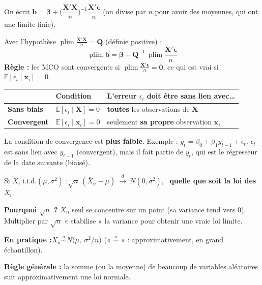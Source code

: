 \documentclass[12pt,a4paper]{article}
\newcommand{\vX}{\mathbf{X}}\newcommand{\vb}{\mathbf{b}}\newcommand{\vx}{\mathbf{x}}
\newcommand{\vbeta}{\bm{\beta}}\newcommand{\veps}{\bm{\epsilon}}\newcommand{\Q}{\mathbf{Q}}\newcommand{\I}{\mathbf{I}}
\newcommand{\E}{\mathbb{E}}\newcommand{\Var}{\operatorname{Var}}\newcommand{\plim}{\operatorname{plim}}
\begin{document}
\begin{outil}[title={Les MCO sont convergents}]
On écrit $\vb=\vbeta+\Big(\dfrac{\vX'\vX}{n}\Big)^{-1}\dfrac{\vX'\veps}{n}$ (on divise par $n$ pour avoir des moyennes, qui ont une limite finie).

Avec l'hypothèse $\plim\frac{\vX'\vX}{n}=\Q$ (définie positive) :
\[
\plim\vb=\vbeta+\Q^{-1}\,\plim\frac{\vX'\veps}{n}
\]
\textbf{Règle :} les MCO sont convergents si $\plim\frac{\vX'\veps}{n}=\mathbf 0$, ce qui est vrai si $\E[\epsilon_i\mid\vx_i]=0$.
\end{outil}

\begin{outil}[title={Sans biais ou convergent : la différence clé}]
\begin{center}
\renewcommand{\arraystretch}{1.3}
\begin{tabular}{@{}lll@{}}
\toprule
& Condition & L'erreur $\epsilon_i$ doit être sans lien avec\dots \\
\midrule
\textbf{Sans biais} & $\E[\epsilon_i\mid\vX]=0$ & \textbf{toutes} les observations de $\vX$ \\
\textbf{Convergent} & $\E[\epsilon_i\mid\vx_i]=0$ & seulement \textbf{sa propre} observation $\vx_i$ \\
\bottomrule
\end{tabular}
\end{center}
La condition de convergence est \textbf{plus faible}. Exemple : $y_t=\beta_0+\beta_1y_{t-1}+\epsilon_t$. $\epsilon_t$ est sans lien avec $y_{t-1}$ (convergent), mais il fait partie de $y_t$, qui est le régresseur de la date suivante (biaisé).
\end{outil}

\begin{outil}[title={Théorème central limite (TCL)}]
Si $X_i$ i.i.d.$(\mu,\sigma^2)$ :\quad $\sqrt n\,(\bar X_n-\mu)\ \xrightarrow{d}\ N(0,\sigma^2)$, \ \textbf{quelle que soit la loi des $X_i$}.

\textbf{Pourquoi $\sqrt n$ ?} $\bar X_n$ seul se concentre sur un point (sa variance tend vers 0). Multiplier par $\sqrt n$ « stabilise » la variance pour obtenir une vraie loi limite.

\textbf{En pratique :}\quad $\bar X_n\overset{a}{\sim}N\big(\mu,\ \sigma^2/n\big)$ (« $\overset{a}{\sim}$ » : approximativement, en grand échantillon).

\textbf{Règle générale :} la somme (ou la moyenne) de beaucoup de variables aléatoires suit approximativement une loi normale.
\end{outil}
\end{document}

